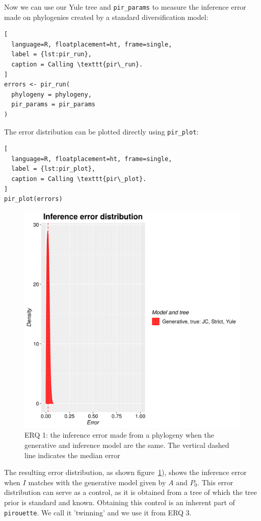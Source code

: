 \documentclass{article}
\begin{document}
Now we can use our Yule tree and \verb;pir_params; to measure 
the inference error made on phylogenies
created by a standard diversification model:

\begin{lstlisting}[
  language=R, floatplacement=ht, frame=single,
  label = {lst:pir_run},
  caption = Calling \texttt{pir\_run}.
]
errors <- pir_run(
  phylogeny = phylogeny,
  pir_params = pir_params
)
\end{lstlisting}

The error distribution can be plotted directly using \verb;pir_plot;:

\begin{lstlisting}[
  language=R, floatplacement=ht, frame=single,
  label = {lst:pir_plot},
  caption = Calling \texttt{pir\_plot}.
]
pir_plot(errors)
\end{lstlisting}

\begin{figure}[ht]
  \includegraphics[width=\textwidth]{example_1/errors.png}
  \caption{
    ERQ 1: the inference error made from a phylogeny 
    when the generative and inference model are the same.
    The vertical dashed line indicates the median error
  }
  \label{fig:example_1}
\end{figure}

The resulting error distribution, as shown figure~\ref{fig:example_1}),
shows the inference error 
when $\mathit{I}$ matches with the generative model given 
by $\mathit{A}$ and $\mathit{P_{0}}$.
This error distribution can serve as a control,
as it is obtained from a tree of which the tree prior is standard and known.
Obtaining this control is an inherent part of \verb;pirouette;. 
We call it 'twinning' and we use it from ERQ 3.
\end{document}
